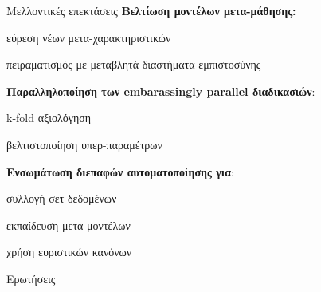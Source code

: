 \documentclass{beamer}
\begin{document}
  \begin{frame}{Μελλοντικές επεκτάσεις} 
  	\textbf{Βελτίωση μοντέλων μετα-μάθησης:}
  	\begin{itemize}
  		{\small
  			 \item εύρεση νέων μετα-χαρακτηριστικών
  			\item πειραματισμός με μεταβλητά διαστήματα εμπιστοσύνης}
  		
  		\end{itemize}  	
  		
  	\textbf{Παραλληλοποίηση των embarassingly parallel διαδικασιών}:
  	\begin{itemize}
  		{\small
  		\item k-fold αξιολόγηση
  		\item βελτιστοποίηση υπερ-παραμέτρων	}
  		 
  	\end{itemize}  	   	  	
  	\textbf{Ενσωμάτωση διεπαφών αυτοματοποίησης για}:
  	\begin{itemize}
  		{\small
  			\item συλλογή σετ δεδομένων
  			\item εκπαίδευση μετα-μοντέλων
  			\item χρήση ευριστικών κανόνων}  		
  	\end{itemize}
  \end{frame}  
  \begin{frame}[standout]{} 
    \begin{center}
    Ερωτήσεις
    \end{center}
  \end{frame}
  \begin{frame}[allowframebreaks]{}
\nocite{*}
\printbibliography[title=Bιβλιογραφία ]
  \end{frame} 
\end{document}

